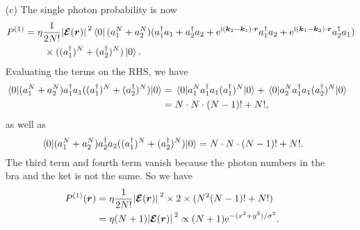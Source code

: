 \documentclass[hyperref, a4paper]{article}
\newcommand*{\ii}{\mathrm{i}}
\newcommand*{\ee}{\mathrm{e}}
\begin{document}
\begin{itemize}
\item[(c)] The single photon probability is now 
\[
    \begin{aligned}
        P^{(1)} &= \eta \frac{1}{2 N!} \abs*{\vb*{\mathcal{E}} (\vb*{r})}^2 \bra*{0} (a_1^N + a_2^N) (a_1^\dagger a_1 + a_2^\dagger a_2 + \ee^{\ii (\vb*{k}_2 - \vb*{k}_1) \cdot \vb*{r}} a_1^\dagger a_2 + \ee^{\ii (\vb*{k}_1 - \vb*{k}_2) \cdot \vb*{r}} a_2^\dagger a_1 ) \\
        &\quad \quad \times ((a_1^\dagger)^N + (a_2^\dagger)^N) \ket*{0}.
    \end{aligned}
\] 
Evaluating the terms on the RHS, we have 
\[
    \begin{aligned}
        \expval*{(a_1^N + a_2^N) a_1^\dagger a_1 ((a_1^\dagger)^N + (a_2^\dagger)^N)}{0}
        &= \expval*{a_1^N a_1^\dagger a_1 (a_1^\dagger)^N }{0} + \expval*{a_2^N a_1^\dagger a_1 (a_2^\dagger)^N }{0} \\
        &= N \cdot N \cdot (N-1)! + N!,
    \end{aligned}
\]
as well as 
\[
    \expval*{(a_1^N + a_2^N) a_2^\dagger a_2 ((a_1^\dagger)^N + (a_2^\dagger)^N)}{0} = N \cdot N \cdot (N-1)! + N!.
\]
The third term and fourth term vanish because the photon numbers in the bra and the ket is not the same.
So we have 
\begin{equation}
    \begin{aligned}
        P^{(1)}(\vb*{r}) &= \eta \frac{1}{2 N!} \abs*{\vb*{\mathcal{E}}(\vb*{r})}^2 \times 2 \times (N^2 (N-1)! + N!) \\
        &= \eta (N+1) \abs*{\vb*{\mathcal{E}}(\vb*{r})}^2  \propto (N+1) \ee^{- (x^2 + y^2) / \sigma^2}.
    \end{aligned}
\end{equation}


\end{itemize}
\end{document}
